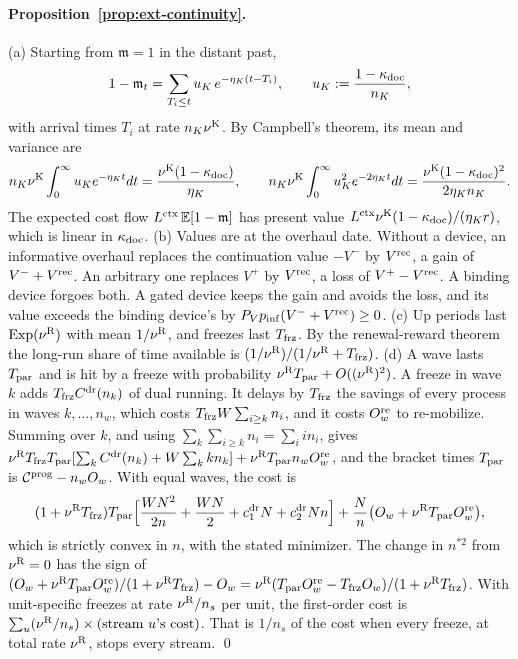 \paragraph{Proposition~\ref{prop:ext-continuity}.} (a) Starting from $\mathfrak m=1$ in the distant past,
\[
1-\mathfrak m_t=\sum_{T_i\le t}u_K\,e^{-\eta_K(t-T_i)},\qquad u_K:=\frac{1-\kappa_{\rm doc}}{n_K},
\]
with arrival times $T_i$ at rate $n_K\nu^{\rm K}$. By Campbell's theorem, its mean and variance are
\[
n_K\nu^{\rm K}\int_0^\infty u_Ke^{-\eta_Kt}dt=\frac{\nu^{\rm K}(1-\kappa_{\rm doc})}{\eta_K},\qquad n_K\nu^{\rm K}\int_0^\infty u_K^2e^{-2\eta_Kt}dt=\frac{\nu^{\rm K}(1-\kappa_{\rm doc})^2}{2\eta_Kn_K}.
\] The expected cost flow $L^{\rm ctx}\,\mathbb E[1-\mathfrak m]$ has present value $L^{\rm ctx}\nu^{\rm K}(1-\kappa_{\rm doc})/(\eta_Kr)$, which is linear in $\kappa_{\rm doc}$.
(b) Values are at the overhaul date. Without a device, an informative overhaul replaces the continuation value $-V^-$ by $V^{\rm rec}$, a gain of $V^-+V^{\rm rec}$. An arbitrary one replaces $V^+$ by $V^{\rm rec}$, a loss of $V^+-V^{\rm rec}$. A binding device forgoes both. A gated device keeps the gain and avoids the loss, and its value exceeds the binding device's by $P_Vp_{\rm inf}(V^-+V^{\rm rec})\ge0$.
(c) Up periods last ${\rm Exp}(\nu^{\rm R})$ with mean $1/\nu^{\rm R}$, and freezes last $T_{\rm frz}$. By the renewal-reward theorem the long-run share of time available is $(1/\nu^{\rm R})/(1/\nu^{\rm R}+T_{\rm frz})$.
(d) A wave lasts $T_{\rm par}$ and is hit by a freeze with probability $\nu^{\rm R}T_{\rm par}+O((\nu^{\rm R})^2)$. A freeze in wave $k$ adds $T_{\rm frz}C^{\rm dr}(n_k)$ of dual running. It delays by $T_{\rm frz}$ the savings of every process in waves $k,\dots,n_w$, which costs $T_{\rm frz}W\sum_{i\ge k}n_i$, and it costs $O^{\rm re}_w$ to re-mobilize. Summing over $k$, and using $\sum_k\sum_{i\ge k}n_i=\sum_iin_i$, gives $\nu^{\rm R}T_{\rm frz}T_{\rm par}[\sum_kC^{\rm dr}(n_k)+W\sum_kkn_k]+\nu^{\rm R}T_{\rm par}n_wO^{\rm re}_w$, and the bracket times $T_{\rm par}$ is $\mathcal C^{\rm prog}-n_wO_w$. With equal waves, the cost is
\[
(1+\nu^{\rm R}T_{\rm frz})T_{\rm par}\Bigl[\frac{WN^2}{2n}+\frac{WN}2+c^{\rm dr}_1N+c^{\rm dr}_2Nn\Bigr]+\frac Nn\bigl(O_w+\nu^{\rm R}T_{\rm par}O^{\rm re}_w\bigr),
\]
which is strictly convex in $n$, with the stated minimizer. The change in $n^{*2}$ from $\nu^{\rm R}=0$ has the sign of $(O_w+\nu^{\rm R}T_{\rm par}O^{\rm re}_w)/(1+\nu^{\rm R}T_{\rm frz})-O_w=\nu^{\rm R}(T_{\rm par}O^{\rm re}_w-T_{\rm frz}O_w)/(1+\nu^{\rm R}T_{\rm frz})$. With unit-specific freezes at rate $\nu^{\rm R}/n_s$ per unit, the first-order cost is $\sum_u(\nu^{\rm R}/n_s)\times(\text{stream }u\text{'s cost})$. That is $1/n_s$ of the cost when every freeze, at total rate $\nu^{\rm R}$, stops every stream. \qed

